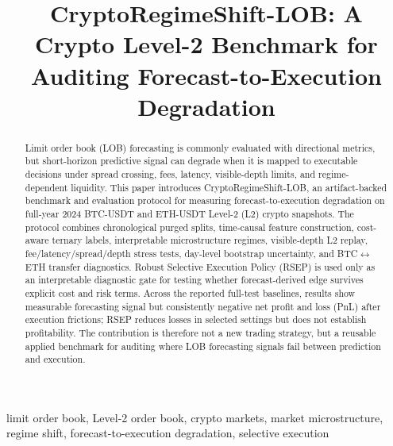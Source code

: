 \documentclass[conference]{IEEEtran}
\begin{document}
\title{CryptoRegimeShift-LOB: A Crypto Level-2 Benchmark for Auditing Forecast-to-Execution Degradation}

\author{
}

\maketitle

\begin{abstract}
Limit order book (LOB) forecasting is commonly evaluated with directional metrics, but short-horizon predictive signal can degrade when it is mapped to executable decisions under spread crossing, fees, latency, visible-depth limits, and regime-dependent liquidity. This paper introduces CryptoRegimeShift-LOB, an artifact-backed benchmark and evaluation protocol for measuring forecast-to-execution degradation on full-year 2024 BTC-USDT and ETH-USDT Level-2 (L2) crypto snapshots. The protocol combines chronological purged splits, time-causal feature construction, cost-aware ternary labels, interpretable microstructure regimes, visible-depth L2 replay, fee/latency/spread/depth stress tests, day-level bootstrap uncertainty, and BTC$\leftrightarrow$ETH transfer diagnostics. Robust Selective Execution Policy (RSEP) is used only as an interpretable diagnostic gate for testing whether forecast-derived edge survives explicit cost and risk terms. Across the reported full-test baselines, results show measurable forecasting signal but consistently negative net profit and loss (PnL) after execution frictions; RSEP reduces losses in selected settings but does not establish profitability. The contribution is therefore not a new trading strategy, but a reusable applied benchmark for auditing where LOB forecasting signals fail between prediction and execution.
\end{abstract}

\begin{IEEEkeywords}
limit order book, Level-2 order book, crypto markets, market microstructure, regime shift, forecast-to-execution degradation, selective execution
\end{IEEEkeywords}
\end{document}
